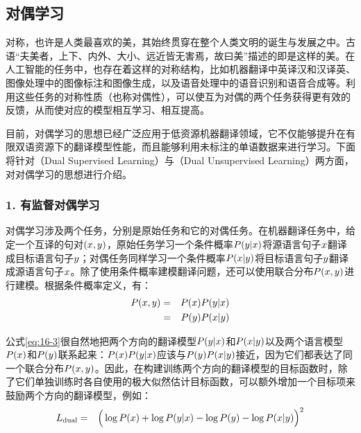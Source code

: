 \subsection{对偶学习}

\parinterval 对称，也许是人类最喜欢的美，其始终贯穿在整个人类文明的诞生与发展之中。古语“夫美者，上下、内外、大小、远近皆无害焉，故曰美”描述的即是这样的美。在人工智能的任务中，也存在着这样的对称结构，比如机器翻译中英译汉和汉译英、图像处理中的图像标注和图像生成，以及语音处理中的语音识别和语音合成等。利用这些任务的对称性质（也称对偶性），可以使互为对偶的两个任务获得更有效的反馈，从而使对应的模型相互学习、相互提高。



目前，对偶学习的思想已经广泛应用于低资源机器翻译领域，它不仅能够提升在有限双语资源下的翻译模型性能，而且能够利用未标注的单语数据来进行学习。下面将针对{\small{}}（Dual Supervised Learning）与{\small{}}（Dual Unsupervised Learning）两方面，对对偶学习的思想进行介绍。

\subsubsection{1. 有监督对偶学习}

\parinterval 对偶学习涉及两个任务，分别是原始任务和它的对偶任务。在机器翻译任务中，给定一个互译的句对$({x},{y})$，原始任务学习一个条件概率${P}({y}|{x})$将源语言句子${x}$翻译成目标语言句子${y}$；对偶任务同样学习一个条件概率${P}({x}|{y})$将目标语言句子${y}$翻译成源语言句子${x}$。除了使用条件概率建模翻译问题，还可以使用联合分布${P}({x},{y})$进行建模。根据条件概率定义，有：
\begin{eqnarray}
{P}({x},{y}) &=& {P}({x}){P}({y}|{x}) \nonumber \\
&=& {P}({y}){P}({x}|{y})
\label{eq:16-3}
\end{eqnarray}

\parinterval 公式\eqref{eq:16-3}很自然地把两个方向的翻译模型${P}({y}|{x})$和${P}({x}|{y})$以及两个语言模型${P}({x})$和${P}({y})$联系起来：${P}({x}){P}({y}|{x})$应该与${P}({y}){P}({x}|{y})$接近，因为它们都表达了同一个联合分布${P}({x},{y})$。因此，在构建训练两个方向的翻译模型的目标函数时，除了它们单独训练时各自使用的极大似然估计目标函数，可以额外增加一个目标项来鼓励两个方向的翻译模型，例如：
\begin{eqnarray}
{L}_{\rm{dual}} & = & \Big(\log{{P}({x})} + \log{{P}({y}|{x})} - \log{{P}({y})} - \log{{P}({x}|{y})\Big)^{2}}
\label{eq:16-4}
\end{eqnarray}

